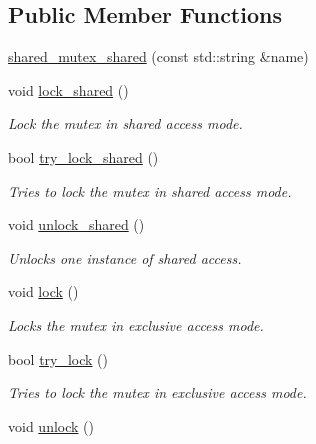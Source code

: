 \subsection*{Public Member Functions}
\begin{DoxyCompactItemize}
\item 
\hyperlink{classcpen333_1_1process_1_1impl_1_1shared__mutex__shared_aa94fee843eb846e57c4ac51589172849}{shared\+\_\+mutex\+\_\+shared} (const std\+::string \&name)
\item 
void \hyperlink{classcpen333_1_1process_1_1impl_1_1shared__mutex__shared_a29036d76ee3f41ae157bb87b4316ea97}{lock\+\_\+shared} ()
\begin{DoxyCompactList}\small\item\em Lock the mutex in shared access mode. \end{DoxyCompactList}\item 
bool \hyperlink{classcpen333_1_1process_1_1impl_1_1shared__mutex__shared_a382dfc90cc323e70879de8e69bcb7e24}{try\+\_\+lock\+\_\+shared} ()
\begin{DoxyCompactList}\small\item\em Tries to lock the mutex in shared access mode. \end{DoxyCompactList}\item 
void \hyperlink{classcpen333_1_1process_1_1impl_1_1shared__mutex__shared_a4a7331e891ef08ffddda51ab5722fac6}{unlock\+\_\+shared} ()
\begin{DoxyCompactList}\small\item\em Unlocks one instance of shared access. \end{DoxyCompactList}\item 
void \hyperlink{classcpen333_1_1process_1_1impl_1_1shared__mutex__shared_a48a55c1a0bc4465ce3042eac361b674c}{lock} ()
\begin{DoxyCompactList}\small\item\em Locks the mutex in exclusive access mode. \end{DoxyCompactList}\item 
bool \hyperlink{classcpen333_1_1process_1_1impl_1_1shared__mutex__shared_a14e358b1ecbdebd69fb89fdc3b2a4f61}{try\+\_\+lock} ()
\begin{DoxyCompactList}\small\item\em Tries to lock the mutex in exclusive access mode. \end{DoxyCompactList}\item 
void \hyperlink{classcpen333_1_1process_1_1impl_1_1shared__mutex__shared_aa5a87d5886497263cc6b0f0a4d79f15c}{unlock} ()

\end{DoxyCompactItemize}
